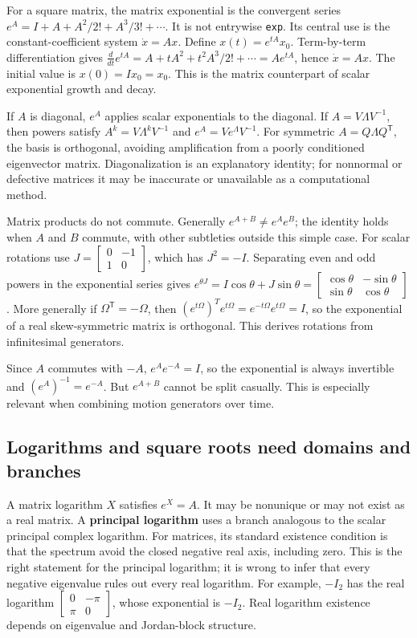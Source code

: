 For a square matrix, the matrix exponential is the convergent series \(e^A=I+A+A^2/2!+A^3/3!+\cdots\). It is not entrywise \texttt{exp}. Its central use is the constant-coefficient system \(\dot x=Ax\). Define \(x(t)=e^{tA}x_0\). Term-by-term differentiation gives \(\frac{d}{dt}e^{tA}=A+ tA^2+t^2A^3/2!+\cdots=Ae^{tA}\), hence \(\dot x=Ax\). The initial value is \(x(0)=Ix_0=x_0\). This is the matrix counterpart of scalar exponential growth and decay.

If \(A\) is diagonal, \(e^A\) applies scalar exponentials to the diagonal. If \(A=V\Lambda V^{-1}\), then powers satisfy \(A^k=V\Lambda^kV^{-1}\) and \(e^A=Ve^\Lambda V^{-1}\). For symmetric \(A=Q\Lambda Q^\mathsf T\), the basis is orthogonal, avoiding amplification from a poorly conditioned eigenvector matrix. Diagonalization is an explanatory identity; for nonnormal or defective matrices it may be inaccurate or unavailable as a computational method.

Matrix products do not commute. Generally \(e^{A+B}\ne e^Ae^B\); the identity holds when \(A\) and \(B\) commute, with other subtleties outside this simple case. For scalar rotations use \(J=\begin{bmatrix}0&-1\\1&0\end{bmatrix}\), which has \(J^2=-I\). Separating even and odd powers in the exponential series gives \(e^{\theta J}=I\cos\theta+J\sin\theta=\begin{bmatrix}\cos\theta&-\sin\theta\\\sin\theta&\cos\theta\end{bmatrix}\). More generally if \(\Omega^\mathsf T=-\Omega\), then \((e^{t\Omega})^Te^{t\Omega}=e^{-t\Omega}e^{t\Omega}=I\), so the exponential of a real skew-symmetric matrix is orthogonal. This derives rotations from infinitesimal generators.

Since \(A\) commutes with \(-A\), \(e^Ae^{-A}=I\), so the exponential is always invertible and \((e^A)^{-1}=e^{-A}\). But \(e^{A+B}\) cannot be split casually. This is especially relevant when combining motion generators over time.

\subsection{Logarithms and square roots need domains and branches}\label{logarithms-and-square-roots-need-domains-and-branches}

A matrix logarithm \(X\) satisfies \(e^X=A\). It may be nonunique or may not exist as a real matrix. A \textbf{principal logarithm} uses a branch analogous to the scalar principal complex logarithm. For matrices, its standard existence condition is that the spectrum avoid the closed negative real axis, including zero. This is the right statement for the principal logarithm; it is wrong to infer that every negative eigenvalue rules out every real logarithm. For example, \(-I_2\) has the real logarithm \(\begin{bmatrix}0&-\pi\\\pi&0\end{bmatrix}\), whose exponential is \(-I_2\). Real logarithm existence depends on eigenvalue and Jordan-block structure.

